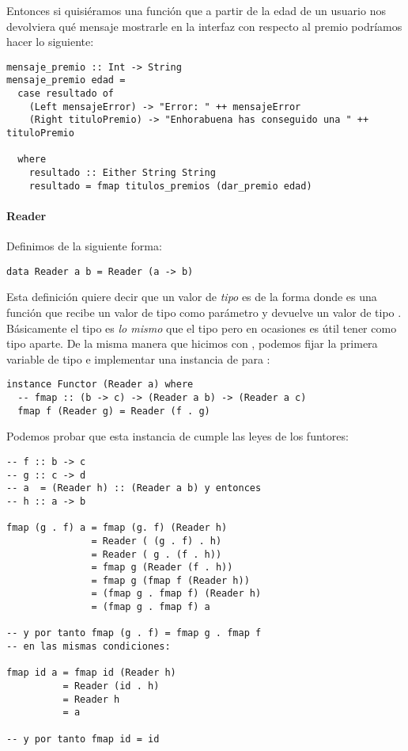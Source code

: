 Entonces si quisiéramos una función que a partir de la edad de
un usuario nos devolviera qué mensaje mostrarle en la interfaz
con respecto al premio podríamos hacer lo siguiente:

\begin{verbatim}
mensaje_premio :: Int -> String
mensaje_premio edad =
  case resultado of
    (Left mensajeError) -> "Error: " ++ mensajeError
    (Right tituloPremio) -> "Enhorabuena has conseguido una " ++ tituloPremio

  where
    resultado :: Either String String
    resultado = fmap titulos_premios (dar_premio edad)
\end{verbatim}

\paragraph{Reader}
Definimos  de la siguiente forma:
\begin{verbatim}
data Reader a b = Reader (a -> b)
\end{verbatim}

Esta definición quiere decir
que un valor de \textit{tipo}  es
de la forma  donde  es
una función que recibe un valor de tipo  como
parámetro y devuelve un valor de tipo . Básicamente
el tipo  es \textit{lo mismo} que el
tipo  pero en ocasiones es útil tener 
como tipo aparte.
De la misma manera
que hicimos con , podemos fijar la primera variable
de tipo e implementar una instancia de  para
:

\begin{verbatim}
instance Functor (Reader a) where
  -- fmap :: (b -> c) -> (Reader a b) -> (Reader a c)
  fmap f (Reader g) = Reader (f . g)
\end{verbatim}

Podemos probar que esta instancia de  cumple
las leyes de los funtores:

\begin{verbatim}
-- f :: b -> c
-- g :: c -> d
-- a  = (Reader h) :: (Reader a b) y entonces
-- h :: a -> b

fmap (g . f) a = fmap (g. f) (Reader h)
               = Reader ( (g . f) . h)
               = Reader ( g . (f . h))
               = fmap g (Reader (f . h))
               = fmap g (fmap f (Reader h))
               = (fmap g . fmap f) (Reader h)
               = (fmap g . fmap f) a

-- y por tanto fmap (g . f) = fmap g . fmap f
-- en las mismas condiciones:

fmap id a = fmap id (Reader h)
          = Reader (id . h)
          = Reader h
          = a

-- y por tanto fmap id = id
\end{verbatim}

